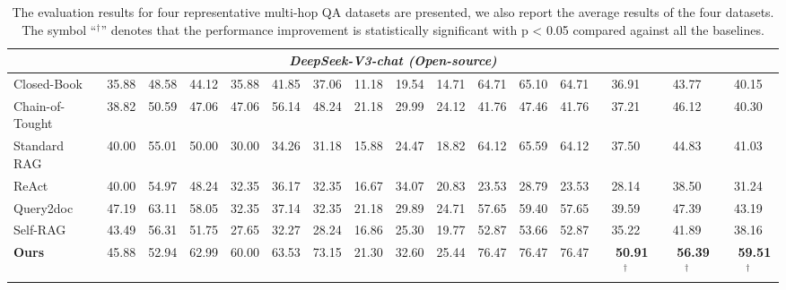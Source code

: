 \begin{table*}[t]
{\begin{tabular}{lccccccccccccccc}
\midrule
\multicolumn{16}{c}{\textit{DeepSeek-V3-chat (Open-source)}} \\
\midrule
Closed-Book & 35.88 & 48.58 & 44.12 & 35.88 & 41.85 & 37.06 & 11.18 & 19.54 & 14.71 & 64.71 & 65.10 & 64.71 & 36.91 & 43.77 & 40.15 \\
\multicolumn{1}{l}{Chain-of-Tought} & 38.82 & 50.59 & 47.06 & 47.06 & 56.14 & 48.24 & 21.18 & 29.99 & 24.12 & 41.76 & 47.46 & 41.76 & 37.21 & 46.12 & 40.30 \\
\multicolumn{1}{l}{Standard RAG} & 40.00 & 55.01 & 50.00 & 30.00 & 34.26 & 31.18 & 15.88 & 24.47 & 18.82 & 64.12 & 65.59 & 64.12 & 37.50 & 44.83 & 41.03 \\
\cmidrule(lr){2-16}
\multicolumn{1}{l}{ReAct} & 40.00 & 54.97 & 48.24 & 32.35 & 36.17 & 32.35 & 16.67 & 34.07 & 20.83 & 23.53 & 28.79 & 23.53 & 28.14 & 38.50 & 31.24 \\
\multicolumn{1}{l}{Query2doc} & 47.19 & 63.11 & 58.05 & 32.35 & 37.14 & 32.35 & 21.18 & 29.89 & 24.71 & 57.65 & 59.40 & 57.65 & 39.59 & 47.39 & 43.19 \\
\multicolumn{1}{l}{Self-RAG} & 43.49 & 56.31 & 51.75 & 27.65 & 32.27 & 28.24 & 16.86 & 25.30 & 19.77 & 52.87 & 53.66 & 52.87 & 35.22 & 41.89 & 38.16 \\
\cmidrule{2-16}
\textbf{Ours} & 45.88 & 52.94 & 62.99 & 60.00 & 63.53 & 73.15 & 21.30 & 32.60 & 25.44 & 76.47 & 76.47 & 76.47 & \ \ \textbf{50.91}$^{\dagger}$ & \ \ \textbf{56.39}$^{\dagger}$ & \ \ \textbf{59.51}$^{\dagger}$ \\
\bottomrule
\end{tabular}}
\caption{The evaluation results for four representative multi-hop QA datasets are presented, we also report the average results of the four datasets. The symbol ``$^{\dagger}$'' denotes that the performance improvement is statistically significant with p < 0.05 compared against all the baselines.}
\label{tab:main-result}
\end{table*}



